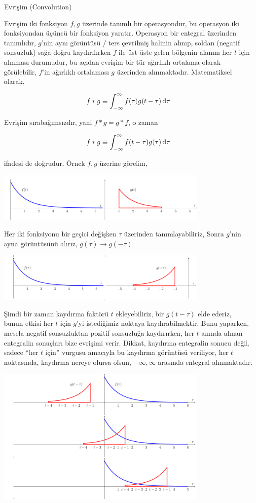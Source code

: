 \documentclass[12pt,fleqn]{article}\usepackage{../../common}
\begin{document}
Evrişim (Convolution)

Evrişim iki fonksiyon $f,g$ üzerinde tanımlı bir operasyondur, bu operasyon
iki fonksiyondan üçüncü bir fonksiyon yaratır. Operasyon bir entegral
üzerinden tanımlıdır, $g$'nin aynı görüntüsü / ters çevrilmiş halinin
alınıp, soldan (negatif sonsuzluk) sağa doğru kaydırılırken $f$ ile üst
üste gelen bölgenin alanını her $t$ için alınması durumudur, bu açıdan
evrişim bir tür ağırlıklı ortalama olarak görülebilir, $f$'in ağırlıklı
ortalaması $g$ üzerinden alınmaktadır. Matematiksel olarak,

$$f * g \equiv \int_{-\infty}^{\infty} f(\tau)g(t-\tau) \,\mathrm{d}\tau $$

Evrişim sırabağımsızdır, yani $f * g = g * f$, o zaman 

$$f * g \equiv \int_{-\infty}^{\infty} f(t-\tau)g(\tau) \,\mathrm{d}\tau $$

ifadesi de doğrudur. Örnek $f,g$ üzerine görelim, 

\includegraphics[width=28em]{tser_conv_01.png}

Her iki fonksiyonu bir geçici değişken $\tau$ üzerinden tanımlayabiliriz,
Sonra $g$'nin ayna görüntüsünü alırız, $g(\tau) \to g(-\tau)$

\includegraphics[width=28em]{tser_conv_02.png}

Şimdi bir zaman kaydırma faktörü $t$ ekleyebiliriz, bir $g(t-\tau)$ elde
ederiz, bunun etkisi her $t$ için $g$'yi istediğimiz noktaya
kaydırabilmektir. Bunu yaparken, mesela negatif sonsuzluktan pozitif
sonsuzluğa kaydırırken, her $t$ anında alınan entegralin sonuçları bize
evrişimi verir. Dikkat, kaydırma entegralin sonucu değil, sadece ``her $t$
için'' vurgusu amacıyla bu kaydırma görüntüsü veriliyor, her $t$
noktasında, kaydırma nereye olursa olsun, $-\infty,\infty$ arasında
entegral alınmaktadır.

\includegraphics[width=28em]{tser_conv_03.png}
\end{document}

